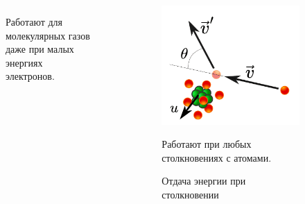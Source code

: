 \documentclass{beamer}
\begin{document}
\begin{frame}
\begin{columns}[t]
\begin{figure}
				Работают для молекулярных газов даже при малых энергиях электронов.
			\end{figure}
			
			\begin{figure}
				\centering
				\includegraphics[width=0.8\linewidth]{res/recoil_loss.png}
				\caption*{Отдача энергии при столкновении}
				
				Работают при любых столкновениях с атомами.
			\end{figure}
			
		\end{columns}
		
%		
%		
%		
%		
%		
	\end{frame}
	
\end{document}
